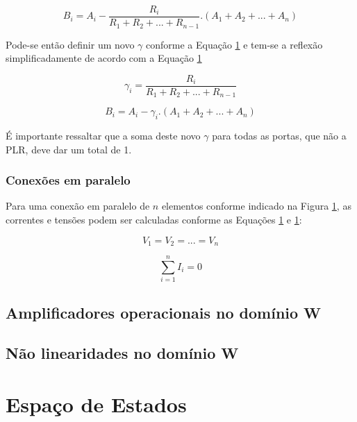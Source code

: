 	\begin{equation}
		B_i = A_i - \frac{R_i}{R_1+R_2+...+R_{n-1}}.(A_1+A_2+...+A_n)
	\end{equation}
	
	Pode-se então definir um novo $\gamma$ conforme a Equação \ref{} e tem-se a reflexão simplificadamente de acordo com a Equação \ref{}
	
	\begin{equation}
		\gamma_i = \frac{R_i}{R_1+R_2+...+R_{n-1}}
	\end{equation} 
	
	\begin{equation}
		B_i = A_i - \gamma_i.(A_1+A_2+...+A_n)
	\end{equation}

	É importante ressaltar que a soma deste novo $\gamma$ para todas as portas, que não a PLR, deve dar um total de 1.
	
		\subsubsection{Conexões em paralelo}
	
	Para uma conexão em paralelo de $n$ elementos conforme indicado na Figura \ref{}, as correntes e tensões podem ser calculadas conforme as Equações \ref{} e \ref{}:
	
	\begin{equation}
		V_1 = V_2 = ... = V_n
	\end{equation}
	
	\begin{equation}
		\sum_{i=1}^{n} I_i = 0
	\end{equation}
	
	
	\subsection{Amplificadores operacionais no domínio W}
	\subsection{Não linearidades no domínio W}
	
	\section{Espaço de Estados}

